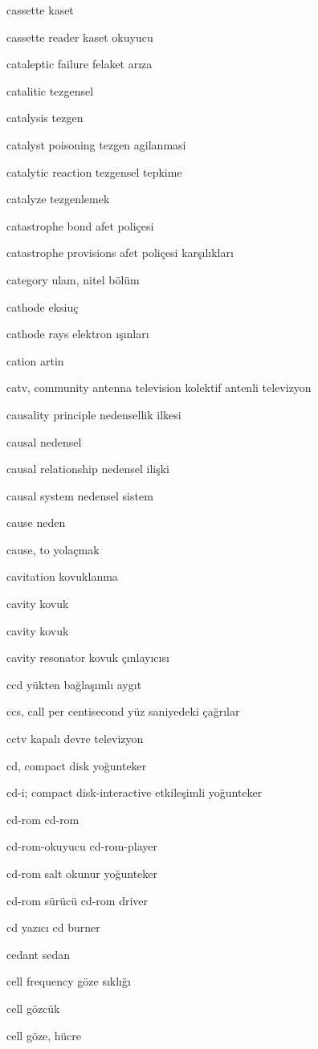 \documentclass[12pt,fleqn]{article}\usepackage{../../common}
\begin{document}
cassette kaset

cassette reader kaset okuyucu

cataleptic failure felaket arıza

catalitic tezgensel

catalysis tezgen

catalyst poisoning tezgen agilanmasi

catalytic reaction tezgensel tepkime

catalyze tezgenlemek

catastrophe bond afet poliçesi

catastrophe provisions afet poliçesi karşılıkları

category ulam, nitel bölüm

cathode eksiuç

cathode rays elektron ışınları

cation artin

catv, community antenna television kolektif antenli televizyon

causality principle nedensellik ilkesi

causal nedensel

causal relationship nedensel ilişki

causal system nedensel sistem

cause neden

cause, to yolaçmak

cavitation kovuklanma

cavity kovuk

cavity kovuk

cavity resonator kovuk çınlayıcısı

ccd yükten bağlaşımlı aygıt

ccs, call per centisecond yüz saniyedeki çağrılar

cctv kapalı devre televizyon

cd, compact disk yoğunteker

cd-i; compact disk-interactive etkileşimli yoğunteker

cd-rom cd-rom

cd-rom-okuyucu cd-rom-player

cd-rom salt okunur yoğunteker

cd-rom sürücü cd-rom driver

cd yazıcı cd burner

cedant sedan

cell frequency göze sıklığı

cell gözcük

cell göze, hücre
\end{document}
